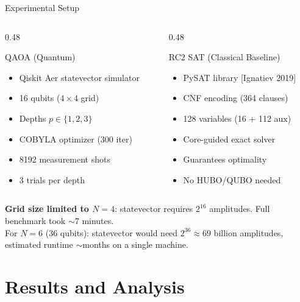 \documentclass[aspectratio=169]{beamer}
\begin{document}
\begin{frame}{Experimental Setup}

\begin{columns}
\begin{column}{0.48\textwidth}
\begin{block}{QAOA (Quantum)}
\begin{itemize}
    \item Qiskit Aer statevector simulator
    \item 16 qubits ($4\times4$ grid)
    \item Depths $p \in \{1, 2, 3\}$
    \item COBYLA optimizer (300 iter)
    \item 8192 measurement shots
    \item 3 trials per depth
\end{itemize}
\end{block}
\end{column}

\begin{column}{0.48\textwidth}
\begin{block}{RC2 SAT (Classical Baseline)}
\begin{itemize}
    \item PySAT library [Ignatiev 2019]
    \item CNF encoding (364 clauses)
    \item 128 variables (16 + 112 aux)
    \item Core-guided exact solver
    \item Guarantees optimality
    \item No HUBO/QUBO needed
\end{itemize}
\end{block}
\end{column}
\end{columns}

\bigskip
\textbf{Grid size limited to $N=4$}: statevector requires $2^{16}$ amplitudes. Full benchmark took $\sim$7 minutes.\\
For $N=6$ (36 qubits): statevector would need $2^{36} \approx 69$ billion amplitudes, estimated runtime $\sim$months on a single machine.
\end{frame}

\section{Results and Analysis}
\end{document}
